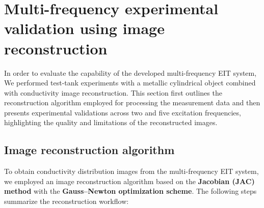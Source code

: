 \section{Multi-frequency experimental validation using image reconstruction}
In order to evaluate the capability of the developed multi-frequency EIT system,
We performed test-tank experiments with a metallic cylindrical object combined with conductivity image
reconstruction. This section first outlines the reconstruction algorithm employed
for processing the measurement data and then presents experimental validations
across two and five excitation frequencies, highlighting the quality and
limitations of the reconstructed images.

\subsection{Image reconstruction algorithm}

To obtain conductivity distribution images from the multi-frequency EIT system, we employed an image reconstruction algorithm based on the \textbf{Jacobian (JAC) method} with the \textbf{Gauss--Newton optimization scheme}. The following steps summarize the reconstruction workflow:

